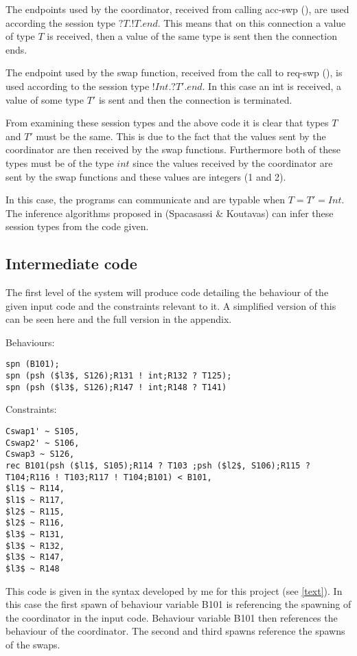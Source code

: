 The endpoints used by the coordinator, received from calling acc-swp (), are used according the session type $?T.!T.end$. This means that on this connection a value of type $T$ is received, then a value of the same type is sent then the connection ends. 

The endpoint used by the swap function, received from the call to req-swp (), is used according to the session type $!Int.?T'.end$. In this case an int is received, a value of some type $T'$ is sent and then the connection is terminated. 

From examining these session types and the above code it is clear that types $T$ and $T'$ must be the same. This is due to the fact that the values sent by the coordinator are then received by the swap functions. Furthermore both of these types must be of the type $int$ since the values received by the coordinator are sent by the swap functions and these values are integers (1 and 2).

In this case, the programs can communicate and are typable when $T=T'=Int$. The inference algorithms proposed in (Spacasassi \& Koutavas)\cite{paper1} can infer these session types from the code given. 

\subsection{Intermediate code}

The first level of the system will produce code detailing the behaviour of the given input code and the constraints relevant to it. A simplified version of this can be seen here and the full version in the appendix. 

Behaviours:
\begin{lstlisting}
spn (B101);
spn (psh ($l3$, S126);R131 ! int;R132 ? T125);
spn (psh ($l3$, S126);R147 ! int;R148 ? T141)
\end{lstlisting}
Constraints:
\begin{lstlisting}
Cswap1' ~ S105,
Cswap2' ~ S106,
Cswap3 ~ S126,
rec B101(psh ($l1$, S105);R114 ? T103 ;psh ($l2$, S106);R115 ? T104;R116 ! T103;R117 ! T104;B101) < B101,
$l1$ ~ R114,
$l1$ ~ R117,
$l2$ ~ R115,
$l2$ ~ R116,
$l3$ ~ R131,
$l3$ ~ R132,
$l3$ ~ R147,
$l3$ ~ R148
\end{lstlisting}

This code is given in the syntax developed by me for this project (see \ref{text}). In this case the first spawn of behaviour variable B101 is referencing the spawning of the coordinator in the input code. Behaviour variable B101 then references the behaviour of the coordinator. The second and third spawns reference the spawns of the swaps. 

